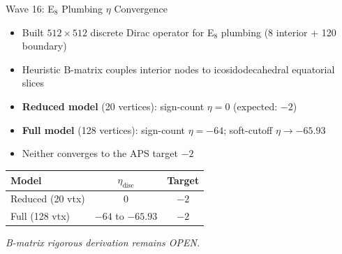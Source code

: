 \documentclass[aspectratio=169,11pt]{beamer}
\begin{document}
\begin{frame}{Wave 16: E$_8$ Plumbing $\eta$ Convergence}
  \begin{itemize}
    \item Built $512 \times 512$ discrete Dirac operator for E$_8$ plumbing (8 interior + 120 boundary)
    \item Heuristic B-matrix couples interior nodes to icosidodecahedral equatorial slices
    \item \textbf{Reduced model} (20 vertices): sign-count $\eta = 0$ (expected: $-2$)
    \item \textbf{Full model} (128 vertices): sign-count $\eta = -64$; soft-cutoff $\eta \to -65.93$
    \item Neither converges to the APS target $-2$
  \end{itemize}
  \vfill
  \begin{center}
    \begin{tabular}{lcc}
      \toprule
      Model & $\eta_{\text{disc}}$ & Target \\
      \midrule
      Reduced (20 vtx) & $0$ & $-2$ \\
      Full (128 vtx) & $-64$ to $-65.93$ & $-2$ \\
      \bottomrule
    \end{tabular}
  \end{center}
  \vfill
  \small\textit{B-matrix rigorous derivation remains OPEN.}
\end{frame}
\end{document}
